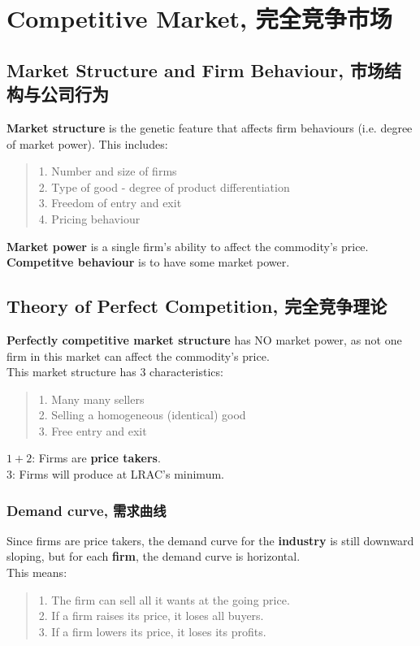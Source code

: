 \section{Competitive Market, 完全竞争市场}

\subsection{Market Structure and Firm Behaviour, 市场结构与公司行为}
\textbf{Market structure} is the genetic feature that affects firm behaviours (i.e. degree of market power). This includes:
\begin{quote}
    1. Number and size of firms \\
    2. Type of good - degree of product differentiation \\
    3. Freedom of entry and exit \\
    4. Pricing behaviour
\end{quote}
\textbf{Market power} is a single firm's ability to affect the commodity's price. \\
\textbf{Competitve behaviour} is to have some market power.

\subsection{Theory of Perfect Competition, 完全竞争理论}
\textbf{Perfectly competitive market structure} has NO market power, as not one firm in this market can affect the commodity's price. \\
This market structure has $3$ characteristics:
\begin{quote}
    1. Many many sellers \\
    2. Selling a homogeneous (identical) good \\
    3. Free entry and exit
\end{quote}
$1+2$: Firms are \textbf{price takers}. \\
$3$: Firms will produce at LRAC's minimum.
\subsubsection{Demand curve, 需求曲线}
Since firms are price takers, the demand curve for the \textbf{industry} is still downward sloping, but for each \textbf{firm}, the demand curve is horizontal. \\
This means:
\begin{quote}
    1. The firm can sell all it wants at the going price. \\
    2. If a firm raises its price, it loses all buyers. \\
    3. If a firm lowers its price, it loses its profits.
\end{quote}
